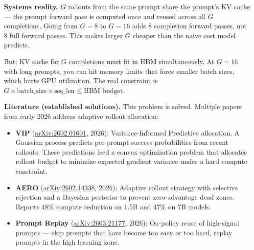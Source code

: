 \textbf{Systems reality.} $G$ rollouts from the same prompt share the prompt's KV cache --- the prompt forward pass is computed once and reused across all $G$ completions. Going from $G = 8$ to $G = 16$ adds 8 completion forward passes, not 8 full forward passes. This makes larger $G$ cheaper than the naive cost model predicts.

But: KV cache for $G$ completions must fit in HBM simultaneously. At $G = 16$ with long prompts, you can hit memory limits that force smaller batch sizes, which hurts GPU utilization. The real constraint is $G \times \text{batch\_size} \times \text{seq\_len} \leq \text{HBM budget}$.

\textbf{Literature (established solutions).} This problem is solved. Multiple papers from early 2026 address adaptive rollout allocation:

\begin{itemize}
  \item \textbf{VIP} (\href{https://arxiv.org/abs/2602.01601}{arXiv:2602.01601}, 2026): Variance-Informed Predictive allocation. A Gaussian process predicts per-prompt success probabilities from recent rollouts. These predictions feed a convex optimization problem that allocates rollout budget to minimize expected gradient variance under a hard compute constraint.
  \item \textbf{AERO} (\href{https://arxiv.org/abs/2602.14338}{arXiv:2602.14338}, 2026): Adaptive rollout strategy with selective rejection and a Bayesian posterior to prevent zero-advantage dead zones. Reports 48\% compute reduction on 1.5B and 47\% on 7B models.
  \item \textbf{Prompt Replay} (\href{https://arxiv.org/abs/2603.21177}{arXiv:2603.21177}, 2026): On-policy reuse of high-signal prompts --- skip prompts that have become too easy or too hard, replay prompts in the high-learning zone.
\end{itemize}

